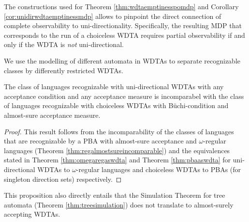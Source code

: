 The constructions used for Theorem \ref{thm:wdtaemptinesspomdp} and Corollary
\ref{cor:unidirwdtaemptinessmdp} allows to pinpoint the direct connection of
complete observability to uni-directionality. Specifically, the resulting
\ac{MDP} that corresponds to the run of a choiceless \ac{WDTA} requires partial
observability if and only if the \ac{WDTA} is \emph{not} uni-directional.

We use the modelling of different automata in \acp{WDTA} to separate
recognizable classes by differently restricted \acp{WDTA}.
\begin{proposition}
  The class of languages recognizable with uni-directional \acp{WDTA} with any
  acceptance condition and any acceptance measure is incomparabel with 
  the class of languages recognizable with choiceless 
  \acp{WDTA} with Büchi-condition and almost-sure acceptance measure.
\end{proposition}
\begin{proof}
  This result follows from the incomparability of the classes of languages that
  are recognizable by a \ac{PBA} with almost-sure acceptance and 
  $\omega$-regular languages (Theorem \ref{thm:regalmostsureincomparable}) and
  the equivalences stated in Theorem \ref{thm:omegaregaswdta} and Theorem 
  \ref{thm:pbaaswdta} for uni-directional \acp{WDTA} to 
  $\omega$-regular languages and choiceless \acp{WDTA} to \acp{PBA} (for 
  singleton direction sets) respectively.
\end{proof}
This proposition also directly entails that the Simulation Theorem for tree
automata (Theorem \ref{thm:treesimulation}) does not translate to almost-surely
accepting \acp{WDTA}.

